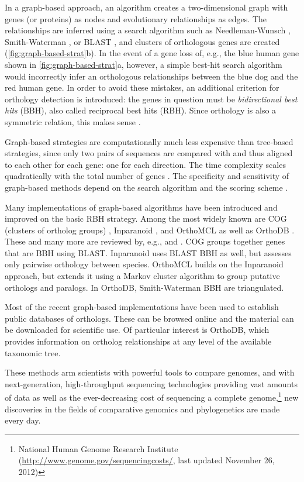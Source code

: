 In a graph-based approach, an algorithm creates a two-dimensional graph with
genes (or proteins) as nodes and evolutionary relationships as edges. The
relationships are inferred using a search algorithm such as Needleman-Wunsch
\citeyearpar{needleman1970}, Smith-Waterman \citeyearpar{smith1981}, or BLAST
\citep{altschul1990}, and clusters of orthologous genes are created
(\autoref{fig:graph-based-strat}b). In the event of a gene loss of, e.g., the
blue human gene shown in \autoref{fig:graph-based-strat}a, however, a simple
best-hit search algorithm would incorrectly infer an orthologous relationships
between the blue dog and the red human gene. In order to avoid these mistakes,
an additional criterion for orthology detection is introduced: the genes in
question must be \emph{bidirectional best hits} (BBH), also called reciprocal
best hits (RBH).  Since orthology is also a symmetric relation, this makes sense
.



Graph-based strategies are computationally much less expensive than tree-based
strategies, since only two pairs of sequences are compared with and thus aligned
to each other for each gene: one for each direction. The time
complexity scales quadratically with the total number of genes
\citep{altenhoff2012-1}. The specificity and sensitivity of graph-based methods
depend on the search algorithm and the scoring scheme \citep{hulsen2006}.

Many implementations of graph-based algorithms have been introduced and improved
on the basic RBH strategy. Among the most widely known are COG (clusters of
ortholog groups) \citep{tatusov2003}, Inparanoid \citep{ostlund2010}, and
OrthoMCL \citep{li2003} as well as OrthoDB \citep{waterhouse2011}. These and
many more are reviewed by, e.g., \citet{kuzniar2008} and \citet{forslund2011}.
COG groups together genes that are BBH using BLAST. Inparanoid uses BLAST BBH as
well, but assesses only pairwise orthology between species. OrthoMCL builds on
the Inparanoid approach, but extends it using a Markov cluster algorithm to
group putative orthologs and paralogs. In OrthoDB, Smith-Waterman BBH are
triangulated.

Most of the recent graph-based implementations have been used to establish
public databases of orthologs. These can be browsed online and the material can
be downloaded for scientific use. Of particular interest is OrthoDB, which
provides information on ortholog relationships at any level of the available
taxonomic tree. 

These methods arm scientists with powerful tools to compare genomes, and with
next-generation, high-throughput sequencing technologies providing vast amounts
of data as well as the ever-decreasing cost of sequencing a complete
genome,\footnote{National Human Genome Research Institute
(\url{http://www.genome.gov/sequencingcosts/}, last updated November 26, 2012)}
new discoveries in the fields of comparative genomics and phylogenetics are made
every day. 

